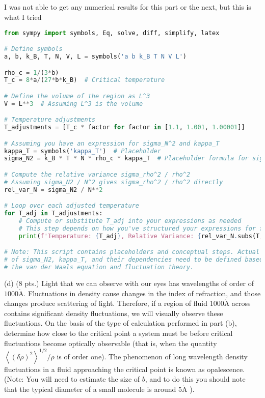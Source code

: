 \documentclass[12pt]{article}
\def\AA{\mathring{\mathrm{A}}}
\begin{document}
\subsection{}
I was not able to get any numerical results for this part or the next, but this is what I tried
\begin{lstlisting}[language=Python]
from sympy import symbols, Eq, solve, diff, simplify, latex

# Define symbols
a, b, k_B, T, N, V, L = symbols('a b k_B T N V L')

rho_c = 1/(3*b)
T_c = 8*a/(27*b*k_B)  # Critical temperature

# Define the volume of the region as L^3
V = L**3  # Assuming L^3 is the volume

# Temperature adjustments
T_adjustments = [T_c * factor for factor in [1.1, 1.001, 1.00001]]

# Assuming you have an expression for sigma_N^2 and kappa_T
kappa_T = symbols('kappa_T')  # Placeholder
sigma_N2 = k_B * T * N * rho_c * kappa_T  # Placeholder formula for sigma_N^2

# Compute the relative variance sigma_rho^2 / rho^2
# Assuming sigma_N2 / N^2 gives sigma_rho^2 / rho^2 directly
rel_var_N = sigma_N2 / N**2

# Loop over each adjusted temperature
for T_adj in T_adjustments:
    # Compute or substitute T_adj into your expressions as needed
    # This step depends on how you've structured your expressions for fluctuations
    print(f'Temperature: {T_adj}, Relative Variance: {rel_var_N.subs(T, T_adj)}')

# Note: This script contains placeholders and conceptual steps. Actual computation
# of sigma_N2, kappa_T, and their dependencies need to be defined based on
# the van der Waals equation and fluctuation theory.

\end{lstlisting}

(d) (8 pts.) Light that we can observe with our eyes has wavelengths of order of $1000 \AA$. Fluctuations in density cause changes in the index of refraction, and those changes produce scattering of light. Therefore, if a region of fluid $1000 \AA$ across contains significant density fluctuations, we will visually observe these fluctuations. On the basis of the type of calculation performed in part (b), determine how close to the critical point a system must be before critical fluctuations become optically observable (that is, when the quantity $\left\langle(\delta \rho)^{2}\right\rangle^{1 / 2} / \rho$ is of order one). The phenomenon of long wavelength density fluctuations in a fluid approaching the critical point is known as opalescence. (Note: You will need to estimate the size of $b$, and to do this you should note that the typical diameter of a small molecule is around $5 \AA$ ).
\end{document}
